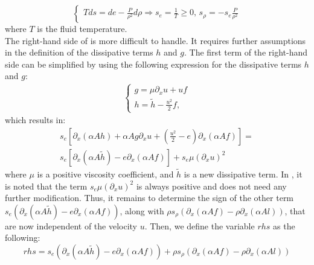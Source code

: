 \begin{equation}
\label{eq:second_th}
\left\{
\begin{array}{l}
Tds = de - \frac{P}{\rho^2} d\rho \Rightarrow s_e = \frac{1}{T} \geq 0 \text{, } s_{\rho} = -s_e \frac{P}{\rho^2}
\end{array}
\right.
\end{equation}
where $T$ is the fluid temperature. \\
The right-hand side of  is more difficult to handle. It requires further assumptions in the definition of the dissipative terms $h$ and $g$.  
The first term of the right-hand side can be simplified by using the following expression for the dissipative terms $h$ and $g$:
\begin{eqnarray}
\boxed{
\left\{
\begin{array}{ll}
g = \mu \partial_x u + u f \\
h = \tilde{h} - \frac{u^2}{2} f,
\end{array}
\right.}
\end{eqnarray}
which results in:
\begin{eqnarray}
\label{eq:ent_equ3}
s_e \left[  \partial_x \left( \alpha A h \right) + \alpha A g \partial_x u + \left( \frac{u^2}{2}-e \right) \partial_x \left( \alpha A f \right)  \right] = \\
s_e \left[ \partial_x \left( \alpha A \tilde{h} \right) - e \partial_x \left( \alpha A f \right) \right] + s_e \mu \left( \partial_x u \right)^2
\end{eqnarray}
where $\mu$ is a positive viscosity coefficient, and $\tilde{h}$ is a new dissipative term. In , it is noted that the term $s_e \mu (\partial_x u)^2$ is always positive and does not need any further modification. Thus, it remains to determine the sign of the other term $s_e\left( \partial_x \left( \alpha A \tilde{h} \right) - e \partial_x \left( \alpha A f \right) \right)$, along with $\rho s_{\rho} \left( \partial_x \left( \alpha A f \right) - \rho \partial_x \left( \alpha A l \right) \right)$, that are now independent of the velocity $u$. Then, we define the variable $rhs$ as the following:
\begin{equation}
\label{eq:rhs1}
rhs = s_e \left( \partial_x \left( \alpha A \tilde{h} \right)-e \partial_x \left( \alpha A f \right) \right) + \rho s_{\rho} \left( \partial_x \left( \alpha A f \right) - \rho \partial_x \left( \alpha A l \right) \right)
\end{equation}
